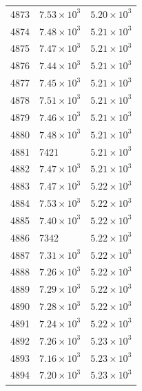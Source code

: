 \begin{table}[H]
\begin{tabular}{lll}
4873 & $\displaystyle 7.53 \times 10^{3}$ & $\displaystyle 5.20 \times 10^{3}$ \\
4874 & $\displaystyle 7.48 \times 10^{3}$ & $\displaystyle 5.21 \times 10^{3}$ \\
4875 & $\displaystyle 7.47 \times 10^{3}$ & $\displaystyle 5.21 \times 10^{3}$ \\
4876 & $\displaystyle 7.44 \times 10^{3}$ & $\displaystyle 5.21 \times 10^{3}$ \\
4877 & $\displaystyle 7.45 \times 10^{3}$ & $\displaystyle 5.21 \times 10^{3}$ \\
4878 & $\displaystyle 7.51 \times 10^{3}$ & $\displaystyle 5.21 \times 10^{3}$ \\
4879 & $\displaystyle 7.46 \times 10^{3}$ & $\displaystyle 5.21 \times 10^{3}$ \\
4880 & $\displaystyle 7.48 \times 10^{3}$ & $\displaystyle 5.21 \times 10^{3}$ \\
4881 & 7421 & $\displaystyle 5.21 \times 10^{3}$ \\
4882 & $\displaystyle 7.47 \times 10^{3}$ & $\displaystyle 5.21 \times 10^{3}$ \\
4883 & $\displaystyle 7.47 \times 10^{3}$ & $\displaystyle 5.22 \times 10^{3}$ \\
4884 & $\displaystyle 7.53 \times 10^{3}$ & $\displaystyle 5.22 \times 10^{3}$ \\
4885 & $\displaystyle 7.40 \times 10^{3}$ & $\displaystyle 5.22 \times 10^{3}$ \\
4886 & 7342 & $\displaystyle 5.22 \times 10^{3}$ \\
4887 & $\displaystyle 7.31 \times 10^{3}$ & $\displaystyle 5.22 \times 10^{3}$ \\
4888 & $\displaystyle 7.26 \times 10^{3}$ & $\displaystyle 5.22 \times 10^{3}$ \\
4889 & $\displaystyle 7.29 \times 10^{3}$ & $\displaystyle 5.22 \times 10^{3}$ \\
4890 & $\displaystyle 7.28 \times 10^{3}$ & $\displaystyle 5.22 \times 10^{3}$ \\
4891 & $\displaystyle 7.24 \times 10^{3}$ & $\displaystyle 5.22 \times 10^{3}$ \\
4892 & $\displaystyle 7.26 \times 10^{3}$ & $\displaystyle 5.23 \times 10^{3}$ \\
4893 & $\displaystyle 7.16 \times 10^{3}$ & $\displaystyle 5.23 \times 10^{3}$ \\
4894 & $\displaystyle 7.20 \times 10^{3}$ & $\displaystyle 5.23 \times 10^{3}$ \\

\end{tabular}
\end{table}
